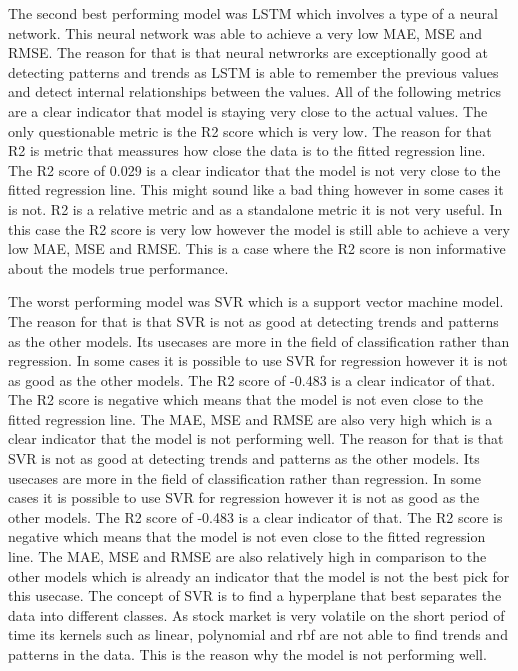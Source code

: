 \documentclass{imc-inf}
\begin{document}
		The second best performing model was LSTM which involves a type of a neural network. This neural network was able to achieve a very low MAE, MSE and RMSE. The reason for that is that neural netwrorks are exceptionally good at detecting 
		patterns and trends as LSTM is able to remember the previous values and detect internal relationships between the values. All of the following metrics are a clear indicator that model is staying very close to the actual values.
		The only questionable metric is the R2 score which is very low. The reason for that R2 is metric that meassures how close the data is to the fitted regression line. The R2 score of 0.029 is a clear indicator that the model is not very close to the fitted regression line. 
		This might sound like a bad thing however in some cases it is not. R2 is a relative metric and as a standalone metric it is not very useful. In this case the R2 score is very low however the model is still able to achieve a very low MAE, MSE and RMSE. This is a case where the R2 score is non informative about the models true performance.

		The worst performing model was SVR which is a support vector machine model. The reason for that is that SVR is not as good at detecting trends and patterns as the other models. Its usecases are more in the field of classification rather than regression. In some cases it is possible to use SVR for regression however it is not as good as the other models. The R2 score of -0.483 is a clear indicator of that.
		The R2 score is negative which means that the model is not even close to the fitted regression line. The MAE, MSE and RMSE are also very high which is a clear indicator that the model is not performing well. The reason for that is that SVR is not as good at detecting trends and patterns as the other models. Its usecases are more in the field of classification rather than regression.
		In some cases it is possible to use SVR for regression however it is not as good as the other models. The R2 score of -0.483 is a clear indicator of that. The R2 score is negative which means that the model is not even close to the fitted regression line. The MAE, MSE and RMSE are also relatively high in comparison to the other models which is already an indicator that the model is not the best pick for this usecase.
		The concept of SVR is to find a hyperplane that best separates the data into different classes. As stock market is very volatile on the short period of time its kernels such as linear, polynomial and rbf are not able to find trends and patterns in the data. This is the reason why the model is not performing well.
		
\end{document}

